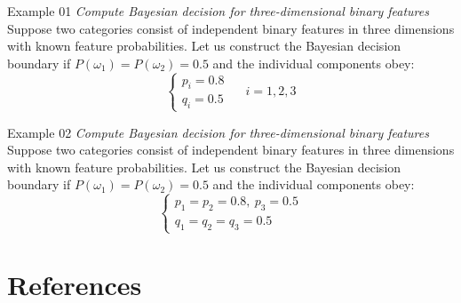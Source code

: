 \begin{frame}{Example 01}
\textit{\color{mycolor2}Compute Bayesian decision for three-dimensional binary features}\\
Suppose two categories consist of independent binary features in three dimensions
with known feature probabilities. Let us construct the Bayesian decision boundary if
$P(\omega_1 ) = P(\omega_2 )=0.5$ and the individual components obey:
\begin{equation}
\left\{ {\begin{array}{*{20}{c}}
{{p_i} = 0.8}\\
{{q_i} = 0.5}
\end{array}} \right.~~~~~~i = 1,2,3\nonumber
\end{equation}
\end{frame}

\begin{frame}{Example 02}
\textit{\color{mycolor2}Compute Bayesian decision for three-dimensional binary features}\\
Suppose two categories consist of independent binary features in three dimensions
with known feature probabilities. Let us construct the Bayesian decision boundary if
$P(\omega_1 ) = P(\omega_2 )=0.5$ and the individual components obey:
\begin{equation}
\left\{ {\begin{array}{*{20}{c}}
{{p_1} = {p_2}=0.8},~p_3=0.5\\
{{q_1} = {q_2} = {q_3} = 0.5}
\end{array}} \right.\nonumber
\end{equation}
\end{frame}

\section{References}
